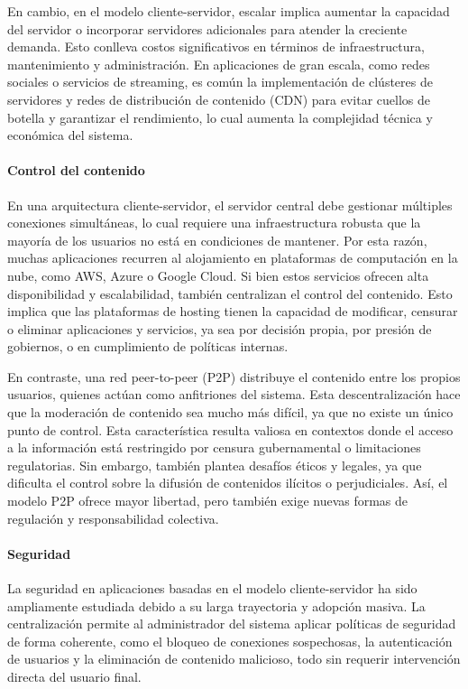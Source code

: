 En cambio, en el modelo cliente-servidor, escalar implica aumentar la capacidad del servidor o incorporar servidores adicionales para atender la creciente demanda. Esto conlleva costos significativos en términos de infraestructura, mantenimiento y administración. En aplicaciones de gran escala, como redes sociales o servicios de streaming, es común la implementación de clústeres de servidores y redes de distribución de contenido (CDN) para evitar cuellos de botella y garantizar el rendimiento, lo cual aumenta la complejidad técnica y económica del sistema.

\paragraph{Control del contenido}

En una arquitectura cliente-servidor, el servidor central debe gestionar múltiples conexiones simultáneas, lo cual requiere una infraestructura robusta que la mayoría de los usuarios no está en condiciones de mantener. Por esta razón, muchas aplicaciones recurren al alojamiento en plataformas de computación en la nube, como AWS, Azure o Google Cloud. Si bien estos servicios ofrecen alta disponibilidad y escalabilidad, también centralizan el control del contenido. Esto implica que las plataformas de hosting tienen la capacidad de modificar, censurar o eliminar aplicaciones y servicios, ya sea por decisión propia, por presión de gobiernos, o en cumplimiento de políticas internas.

En contraste, una red peer-to-peer (P2P) distribuye el contenido entre los propios usuarios, quienes actúan como anfitriones del sistema. Esta descentralización hace que la moderación de contenido sea mucho más difícil, ya que no existe un único punto de control. Esta característica resulta valiosa en contextos donde el acceso a la información está restringido por censura gubernamental o limitaciones regulatorias. Sin embargo, también plantea desafíos éticos y legales, ya que dificulta el control sobre la difusión de contenidos ilícitos o perjudiciales. Así, el modelo P2P ofrece mayor libertad, pero también exige nuevas formas de regulación y responsabilidad colectiva.

\paragraph{Seguridad}

La seguridad en aplicaciones basadas en el modelo cliente-servidor ha sido ampliamente estudiada debido a su larga trayectoria y adopción masiva. La centralización permite al administrador del sistema aplicar políticas de seguridad de forma coherente, como el bloqueo de conexiones sospechosas, la autenticación de usuarios y la eliminación de contenido malicioso, todo sin requerir intervención directa del usuario final.

